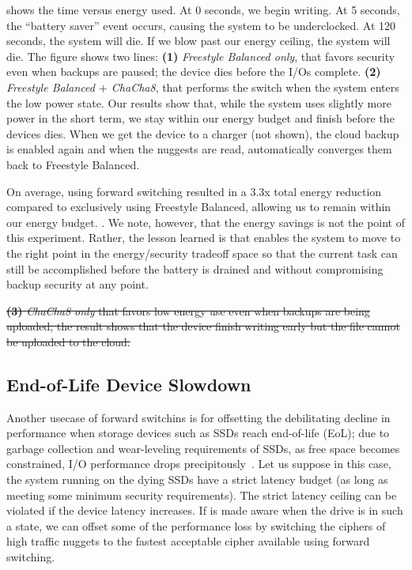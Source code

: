  shows the time versus
energy used. At 0 seconds, we begin writing. At 5 seconds, the ``battery
saver'' event occurs, causing the system to be underclocked. At 120
seconds, the system will die. If we blow past our energy ceiling, the
system will die.
The figure shows two lines:
%
{\bf (1)} {\em Freestyle Balanced only}, that
favors security even when backups are paused;  the device
dies before the I/Os complete.
%
{\bf (2)} {\em Freestyle Balanced $+$ ChaCha8}, that
performs the switch when the system enters the low power state. 
Our results show that, while the system uses slightly more power in the
short term, we stay within our energy budget and finish before the devices dies.
%
When we get the device to a charger (not shown), the cloud backup is enabled
again and when the nuggests are read, \sys automatically converges them back to 
Freestyle Balanced.

On average, using forward switching resulted in a 3.3x total energy
reduction compared to exclusively using Freestyle Balanced, allowing us to
remain within our energy budget. .  We note, however,
that the energy savings is not the point of this experiment. Rather, the
lesson learned is that \sys enables the system to move to the right point
in the energy/security tradeoff space so that the current task can still
be accomplished before the battery is drained and without compromising
backup security at any point.


\sout{{\bf (3)} {\em ChaCha8 only}
that favors low energy use even when backups are being uploaded;
the result shows that the device finish writing early but the file cannot
be uploaded to the cloud.}






\subsection{End-of-Life Device Slowdown} 
\label{subsec:uc3}


Another usecase of forward switchins is for offsetting the debilitating
decline in performance when storage devices such as SSDs reach end-of-life
(EoL); due to garbage collection and wear-leveling requirements of SSDs,
as free space becomes constrained, I/O performance drops
precipitously~\cite{SSDEOL1}.  Let us suppose in this case, the system
running on the dying SSDs have a strict latency budget (as long as meeting
some minimum security requirements).  The strict latency ceiling can be
violated if the device latency increases.  If \sys is made aware when the
drive is in such a state, we can offset some of the performance loss by
switching the ciphers of high traffic nuggets to the fastest acceptable
cipher available using forward switching.

